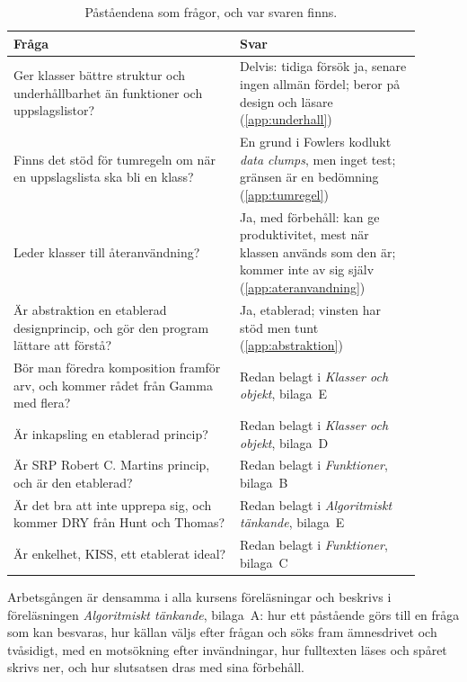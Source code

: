 \begin{table}[htbp]
  \centering
  \caption{Påståendena som frågor, och var svaren finns.}
  \label{tab:paastaenden-tillampningar}
  \begin{tabular}{@{}p{0.5\linewidth}p{0.4\linewidth}@{}}
    \toprule
    Fråga & Svar \\
    \midrule
    Ger klasser bättre struktur och underhållbarhet än funktioner och
      uppslagslistor? & Delvis: tidiga försök ja, senare ingen allmän
      fördel; beror på design och läsare (\cref{app:underhall}) \\
    Finns det stöd för tumregeln om när en uppslagslista ska bli en
      klass? & En grund i Fowlers kodlukt \emph{data clumps}, men
      inget test; gränsen är en bedömning (\cref{app:tumregel}) \\
    Leder klasser till återanvändning? & Ja, med förbehåll: kan ge
      produktivitet, mest när klassen används som den är; kommer inte av
      sig själv (\cref{app:ateranvandning}) \\
    Är abstraktion en etablerad designprincip, och gör den program
      lättare att förstå? & Ja, etablerad; vinsten har stöd men tunt
      (\cref{app:abstraktion}) \\
    Bör man föredra komposition framför arv, och kommer rådet
      från Gamma med flera? & Redan belagt i \emph{Klasser och objekt},
      bilaga~E \\
    Är inkapsling en etablerad princip? & Redan belagt i
      \emph{Klasser och objekt}, bilaga~D \\
    Är SRP Robert C. Martins princip, och är den etablerad? &
      Redan belagt i \emph{Funktioner}, bilaga~B \\
    Är det bra att inte upprepa sig, och kommer DRY från Hunt och
      Thomas? & Redan belagt i \emph{Algoritmiskt tänkande}, bilaga~E \\
    Är enkelhet, KISS, ett etablerat ideal? & Redan belagt i
      \emph{Funktioner}, bilaga~C \\
    \bottomrule
  \end{tabular}
\end{table}

Arbetsgången är densamma i alla kursens föreläsningar och beskrivs i
föreläsningen \emph{Algoritmiskt tänkande}, bilaga~A: hur ett påstående
görs till en fråga som kan besvaras, hur källan väljs efter frågan och
söks fram ämnesdrivet och tvåsidigt, med en motsökning efter
invändningar, hur fulltexten läses och spåret skrivs ner, och hur
slutsatsen dras med sina förbehåll.

